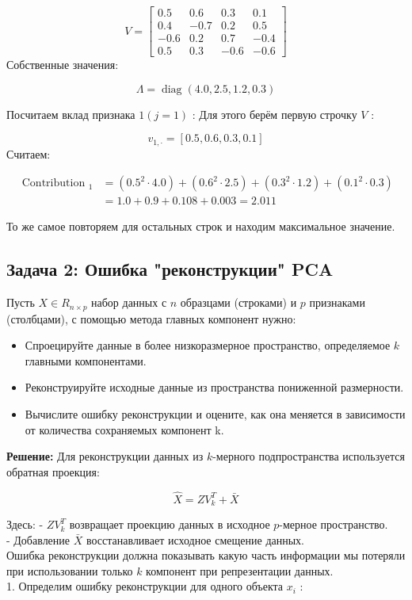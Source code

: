 $$
V=\left[\begin{array}{cccc}
0.5 & 0.6 & 0.3 & 0.1 \\
0.4 & -0.7 & 0.2 & 0.5 \\
-0.6 & 0.2 & 0.7 & -0.4 \\
0.5 & 0.3 & -0.6 & -0.6
\end{array}\right]
$$
Собственные значения:

$$
\Lambda=\operatorname{diag}(4.0,2.5,1.2,0.3)
$$

Посчитаем вклад признака $1(j=1)$ :
Для этого берём первую строчку $V$ :

$$
v_{1, \cdot}=[0.5,0.6,0.3,0.1]
$$
Считаем:

$$
\begin{aligned}
\text { Contribution }_1 & =\left(0.5^2 \cdot 4.0\right)+\left(0.6^2 \cdot 2.5\right)+\left(0.3^2 \cdot 1.2\right)+\left(0.1^2 \cdot 0.3\right) \\
& =1.0+0.9+0.108+0.003=2.011
\end{aligned}
$$

То же самое повторяем для остальных строк и находим максимальное значение.
\subsection{Задача 2: Ошибка "реконструкции" PCA}
Пусть $X \in R_{n\times p}$ набор данных с $n$ образцами (строками) и $p$ признаками (столбцами), с помощью метода главных компонент нужно:
\begin{itemize}
\item{Спроецируйте данные в более низкоразмерное пространство, определяемое $k$ главными компонентами.}
\item {Реконструируйте исходные данные из пространства пониженной размерности.}
\item {Вычислите ошибку реконструкции и оцените, как она меняется в зависимости от количества сохраняемых компонент k.}
\end{itemize}
\textbf{Решение:}
Для реконструкции данных из $k$-мерного подпространства используется обратная проекция:

$$
\hat{X}=Z V_k^T+\bar{X}
$$


Здесь:
- $Z V_k^T$ возвращает проекцию данных в исходное $p$-мерное пространство.\\
- Добавление $\bar{X}$ восстанавливает исходное смещение данных. \\
Ошибка реконструкции должна показывать какую часть информации мы потеряли при использовании только $k$ компонент при репрезентации данных.\\
1. Определим ошибку реконструкции для одного объекта $x_i$ :

